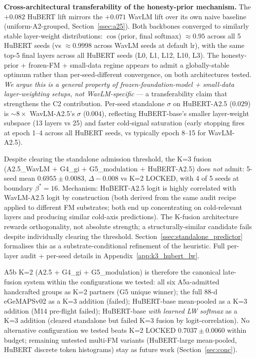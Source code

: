 \textbf{Cross-architectural transferability of the honesty-prior mechanism.} The $+0.082$ HuBERT lift mirrors the $+0.071$ WavLM lift over its own naive baseline (uniform-A2-grouped, Section~\ref{ssec:a25}). Both backbones converged to similarly stable layer-weight distributions: $\cos$(prior, final softmax) $\approx 0.95$ across all 5 HuBERT seeds (vs $\approx 0.9998$ across WavLM seeds at default lr), with the same top-5 final layers across all HuBERT seeds (L0, L1, L12, L10, L3). The honesty-prior + frozen-FM + small-data regime appears to admit a globally-stable optimum rather than per-seed-different convergence, on both architectures tested. \emph{We argue this is a general property of frozen-foundation-model + small-data layer-weighting setups, not WavLM-specific} --- a transferability claim that strengthens the C2 contribution. Per-seed standalone $\sigma$ on HuBERT-A2.5 ($0.029$) is $\sim 8\times$ WavLM-A2.5's $\sigma$ ($0.004$), reflecting HuBERT-base's smaller layer-weight subspace (13 layers vs 25) and faster cold-signal saturation (early stopping fires at epoch 1--4 across all HuBERT seeds, vs typically epoch 8--15 for WavLM-A2.5).

Despite clearing the standalone admission threshold, the K=3 fusion (A2.5\_WavLM $+$ G4\_gi $+$ G5\_modulation $+$ HuBERT-A2.5) does \emph{not} admit: 5-seed mean $0.6955 \pm 0.0083$, $\Delta -0.008$ vs K=2 LOCKED, with 4 of 5 seeds at boundary $\beta^*{=}16$. Mechanism: HuBERT-A2.5 logit is highly correlated with WavLM-A2.5 logit by construction (both derived from the same audit recipe applied to different FM substrates; both end up concentrating on cold-relevant layers and producing similar cold-axis predictions). The K-fusion architecture rewards orthogonality, not absolute strength; a structurally-similar candidate fails despite individually clearing the threshold. Section~\ref{ssec:standalone_predictor} formalises this as a substrate-conditional refinement of the heuristic. Full per-layer audit + per-seed details in Appendix~\ref{app:k3_hubert_lw}.

A5b K=2 (A2.5 + G4\_gi + G5\_modulation) is therefore the canonical late-fusion system within the configurations we tested: all six A5a-admitted handcrafted groups as K=2 partners (G5 unique winner); the full 88-d eGeMAPSv02 as a K=3 addition (failed); HuBERT-base mean-pooled as a K=3 addition (M14 pre-flight failed); HuBERT-base \emph{with learned LW softmax} as a K=3 addition (cleared standalone but failed K=3 fusion by logit-correlation). No alternative configuration we tested beats K=2 LOCKED $0.7037 \pm 0.0060$ within budget; remaining untested multi-FM variants (HuBERT-large mean-pooled, HuBERT discrete token histograms) stay as future work (Section~\ref{sec:conc}).
